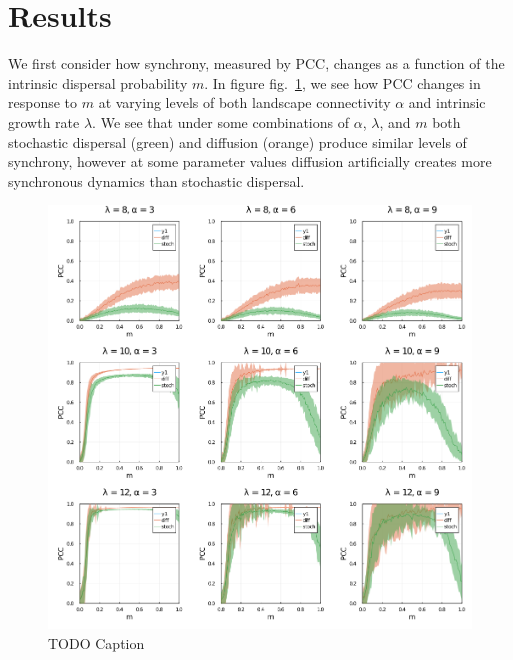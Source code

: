 \documentclass[11pt]{article}
\makeatletter
\def\maxwidth{\ifdim\Gin@nat@width>\linewidth\linewidth
\else\Gin@nat@width\fi}
\let\Oldincludegraphics\includegraphics
\renewcommand{\includegraphics}[1]{\Oldincludegraphics[width=\maxwidth]{#1}}
\makeatother
\begin{document}
\hypertarget{results}{%
\section{Results}\label{results}}

We first consider how synchrony, measured by \(\text{PCC}\), changes as
a function of the intrinsic dispersal probability \(m\). In figure
fig.~\ref{fig:migration_gradient}, we see how \(\text{PCC}\) changes in
response to \(m\) at varying levels of both landscape connectivity
\(\alpha\) and intrinsic growth rate \(\lambda\). We see that under some
combinations of \(\alpha\), \(\lambda\), and \(m\) both stochastic
dispersal (green) and diffusion (orange) produce similar levels of
synchrony, however at some parameter values diffusion artificially
creates more synchronous dynamics than stochastic dispersal.

\begin{figure}
\hypertarget{fig:migration_gradient}{%
\centering
\includegraphics{./figures/migration_gradient_panels.png}
\caption{TODO Caption}\label{fig:migration_gradient}
}
\end{figure}
\end{document}
